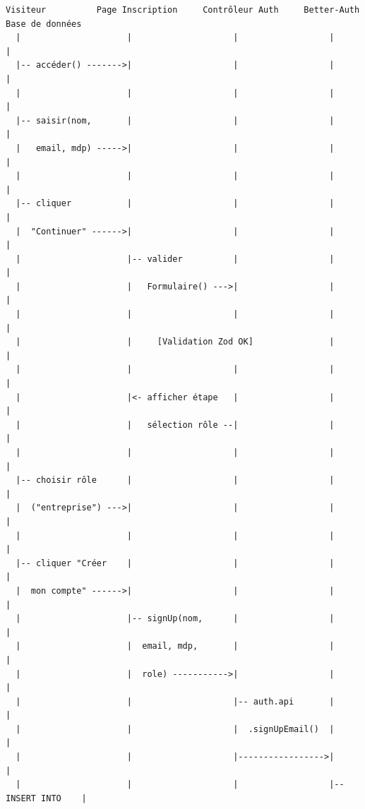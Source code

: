 \documentclass[12pt,a4paper]{article}
\begin{document}
\begin{tcolorbox}[colback=white,colframe=black!50,title=DS-01 — Inscription d'un utilisateur]
\small
\begin{verbatim}
Visiteur          Page Inscription     Contrôleur Auth     Better-Auth      Base de données
  |                     |                    |                  |                  |
  |-- accéder() ------->|                    |                  |                  |
  |                     |                    |                  |                  |
  |-- saisir(nom,       |                    |                  |                  |
  |   email, mdp) ----->|                    |                  |                  |
  |                     |                    |                  |                  |
  |-- cliquer           |                    |                  |                  |
  |  "Continuer" ------>|                    |                  |                  |
  |                     |-- valider          |                  |                  |
  |                     |   Formulaire() --->|                  |                  |
  |                     |                    |                  |                  |
  |                     |     [Validation Zod OK]               |                  |
  |                     |                    |                  |                  |
  |                     |<- afficher étape   |                  |                  |
  |                     |   sélection rôle --|                  |                  |
  |                     |                    |                  |                  |
  |-- choisir rôle      |                    |                  |                  |
  |  ("entreprise") --->|                    |                  |                  |
  |                     |                    |                  |                  |
  |-- cliquer "Créer    |                    |                  |                  |
  |  mon compte" ------>|                    |                  |                  |
  |                     |-- signUp(nom,      |                  |                  |
  |                     |  email, mdp,       |                  |                  |
  |                     |  role) ----------->|                  |                  |
  |                     |                    |-- auth.api       |                  |
  |                     |                    |  .signUpEmail()  |                  |
  |                     |                    |----------------->|                  |
  |                     |                    |                  |-- INSERT INTO    |

\end{verbatim}
\end{tcolorbox}
\end{document}
